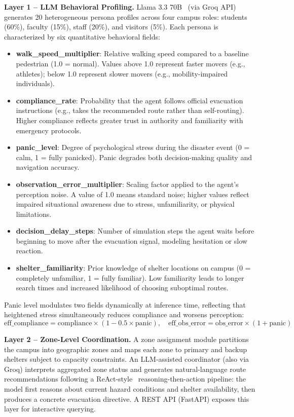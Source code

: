 \documentclass[11pt]{article}
\begin{document}
\textbf{Layer 1 -- LLM Behavioral Profiling.} Llama 3.3 70B~\cite{meta2024llama3} (via Groq API) generates 20 heterogeneous persona profiles across four campus roles: students (60\%), faculty (15\%), staff (20\%), and visitors (5\%). Each persona is characterized by six quantitative behavioral fields:

\begin{itemize}
  \item \textbf{walk\_speed\_multiplier}: Relative walking speed compared to a baseline pedestrian (1.0 = normal). Values above 1.0 represent faster movers (e.g., athletes); below 1.0 represent slower movers (e.g., mobility-impaired individuals).
  \item \textbf{compliance\_rate}: Probability that the agent follows official evacuation instructions (e.g., takes the recommended route rather than self-routing). Higher compliance reflects greater trust in authority and familiarity with emergency protocols.
  \item \textbf{panic\_level}: Degree of psychological stress during the disaster event (0 = calm, 1 = fully panicked). Panic degrades both decision-making quality and navigation accuracy.
  \item \textbf{observation\_error\_multiplier}: Scaling factor applied to the agent's perception noise. A value of 1.0 means standard noise; higher values reflect impaired situational awareness due to stress, unfamiliarity, or physical limitations.
  \item \textbf{decision\_delay\_steps}: Number of simulation steps the agent waits before beginning to move after the evacuation signal, modeling hesitation or slow reaction.
  \item \textbf{shelter\_familiarity}: Prior knowledge of shelter locations on campus (0 = completely unfamiliar, 1 = fully familiar). Low familiarity leads to longer search times and increased likelihood of choosing suboptimal routes.
\end{itemize}

Panic level modulates two fields dynamically at inference time, reflecting that heightened stress simultaneously reduces compliance and worsens perception:
\[
  \text{eff\_compliance} = \text{compliance} \times (1 - 0.5 \times \text{panic}), \quad
  \text{eff\_obs\_error} = \text{obs\_error} \times (1 + \text{panic})
\]

\textbf{Layer 2 -- Zone-Level Coordination.} A zone assignment module partitions the campus into geographic zones and maps each zone to primary and backup shelters subject to capacity constraints. An LLM-assisted coordinator (also via Groq) interprets aggregated zone status and generates natural-language route recommendations following a ReAct-style~\cite{yao2023react} reasoning-then-action pipeline: the model first reasons about current hazard conditions and shelter availability, then produces a concrete evacuation directive. A REST API (FastAPI) exposes this layer for interactive querying.
\end{document}
